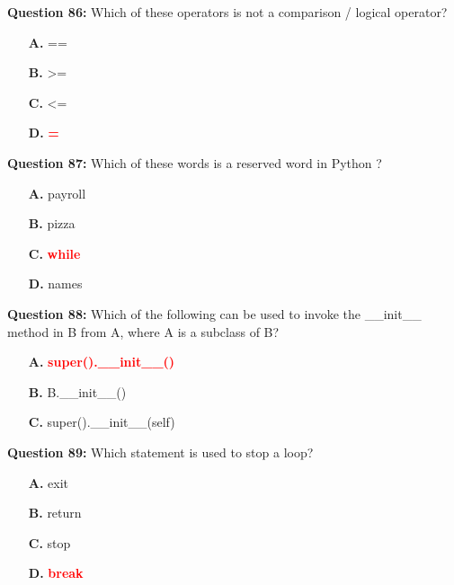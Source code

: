 \documentclass[12pt,a4paper]{article}
\begin{document}
\vspace{0.5cm}

\textbf{Question 86:} Which of these operators is not a comparison / logical operator?

\begin{itemize}
    \item[\textbf{A.}] ==
    \item[\textbf{B.}] >=
    \item[\textbf{C.}] <=
    \item[\textbf{D.}] \textcolor{red}{\textbf{=}}
\end{itemize}

\vspace{0.5cm}

\textbf{Question 87:} Which of these words is a reserved word in Python ?

\begin{itemize}
    \item[\textbf{A.}] payroll
    \item[\textbf{B.}] pizza
    \item[\textbf{C.}] \textcolor{red}{\textbf{while}}
    \item[\textbf{D.}] names
\end{itemize}

\vspace{0.5cm}

\textbf{Question 88:} Which of the following can be used to invoke the __init__ method in B from A, where A is a subclass of B?

\begin{itemize}
    \item[\textbf{A.}] \textcolor{red}{\textbf{super().__init__()}}
    \item[\textbf{B.}] B.__init__()
    \item[\textbf{C.}] super().__init__(self)
\end{itemize}

\vspace{0.5cm}

\textbf{Question 89:} Which statement is used to stop a loop?

\begin{itemize}
    \item[\textbf{A.}] exit
    \item[\textbf{B.}] return
    \item[\textbf{C.}] stop
    \item[\textbf{D.}] \textcolor{red}{\textbf{break}}
\end{itemize}
\end{document}
